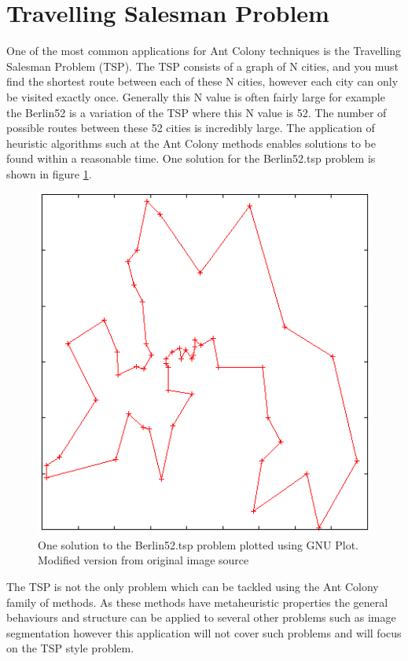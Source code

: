 \section{Travelling Salesman Problem}
\label{tsp}
One of the most common applications for Ant Colony techniques is the Travelling Salesman Problem (TSP). The TSP consists of a graph of N cities, and you must find the shortest route between each of these N cities, however each city can only be visited exactly once. Generally this N value is often fairly large for example the Berlin52\cite{berlin52:source} is a variation of the TSP where this N value is 52. The number of possible routes between these 52 cities is incredibly large. The application of heuristic algorithms such at the Ant Colony methods enables solutions to be found within a reasonable time. One solution for the Berlin52.tsp problem is shown in figure \ref{fig:berlin52}.

\begin{figure}[h!]
\centering
\includegraphics[scale=0.7]{Images/chapter1/tsp52}
\caption{One solution to the Berlin52.tsp problem plotted using GNU Plot. Modified version from original image source \cite{berlin52:image}}
\label{fig:berlin52}
\end{figure}

The TSP is not the only problem which can be tackled using the Ant Colony family of methods. As these methods have metaheuristic properties the general behaviours and structure can be applied to several other problems such as image segmentation however this application will not cover such problems and will focus on the TSP style problem.

